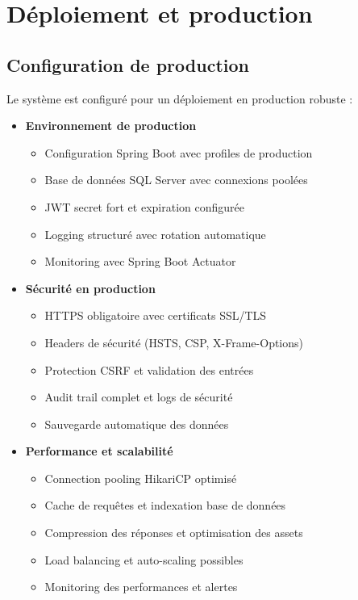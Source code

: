 \documentclass[12pt,a4paper]{report}
\begin{document}
\section{Déploiement et production}

\subsection{Configuration de production}
Le système est configuré pour un déploiement en production robuste :

\begin{itemize}
\item \textbf{Environnement de production}
  \begin{itemize}
  \item Configuration Spring Boot avec profiles de production
  \item Base de données SQL Server avec connexions poolées
  \item JWT secret fort et expiration configurée
  \item Logging structuré avec rotation automatique
  \item Monitoring avec Spring Boot Actuator
  \end{itemize}

\item \textbf{Sécurité en production}
  \begin{itemize}
  \item HTTPS obligatoire avec certificats SSL/TLS
  \item Headers de sécurité (HSTS, CSP, X-Frame-Options)
  \item Protection CSRF et validation des entrées
  \item Audit trail complet et logs de sécurité
  \item Sauvegarde automatique des données
  \end{itemize}

\item \textbf{Performance et scalabilité}
  \begin{itemize}
  \item Connection pooling HikariCP optimisé
  \item Cache de requêtes et indexation base de données
  \item Compression des réponses et optimisation des assets
  \item Load balancing et auto-scaling possibles
  \item Monitoring des performances et alertes
  \end{itemize}
\end{itemize}
\end{document}
